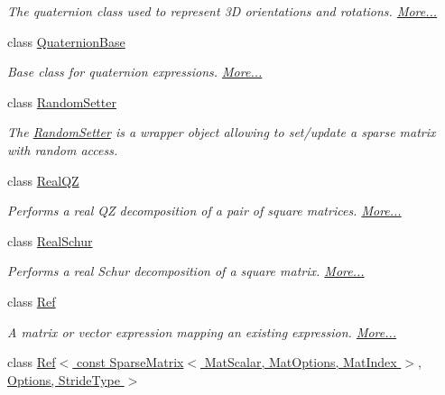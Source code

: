 \begin{DoxyCompactItemize}
\begin{DoxyCompactList}\small\item\em The quaternion class used to represent 3D orientations and rotations.  \hyperlink{group___geometry___module_class_eigen_1_1_quaternion}{More...}\end{DoxyCompactList}\item 
class \hyperlink{group___geometry___module_class_eigen_1_1_quaternion_base}{Quaternion\+Base}
\begin{DoxyCompactList}\small\item\em Base class for quaternion expressions.  \hyperlink{group___geometry___module_class_eigen_1_1_quaternion_base}{More...}\end{DoxyCompactList}\item 
class \hyperlink{class_eigen_1_1_random_setter}{Random\+Setter}
\begin{DoxyCompactList}\small\item\em The \hyperlink{class_eigen_1_1_random_setter}{Random\+Setter} is a wrapper object allowing to set/update a sparse matrix with random access. \end{DoxyCompactList}\item 
class \hyperlink{group___eigenvalues___module_class_eigen_1_1_real_q_z}{Real\+QZ}
\begin{DoxyCompactList}\small\item\em Performs a real QZ decomposition of a pair of square matrices.  \hyperlink{group___eigenvalues___module_class_eigen_1_1_real_q_z}{More...}\end{DoxyCompactList}\item 
class \hyperlink{group___eigenvalues___module_class_eigen_1_1_real_schur}{Real\+Schur}
\begin{DoxyCompactList}\small\item\em Performs a real Schur decomposition of a square matrix.  \hyperlink{group___eigenvalues___module_class_eigen_1_1_real_schur}{More...}\end{DoxyCompactList}\item 
class \hyperlink{group___core___module_class_eigen_1_1_ref}{Ref}
\begin{DoxyCompactList}\small\item\em A matrix or vector expression mapping an existing expression.  \hyperlink{group___core___module_class_eigen_1_1_ref}{More...}\end{DoxyCompactList}\item 
class \hyperlink{class_eigen_1_1_ref_3_01const_01_sparse_matrix_3_01_mat_scalar_00_01_mat_options_00_01_mat_index1bbfd78857ba9c14d54178cb3009ac38}{Ref$<$ const Sparse\+Matrix$<$ Mat\+Scalar, Mat\+Options, Mat\+Index $>$, Options, Stride\+Type $>$}

\end{DoxyCompactItemize}
